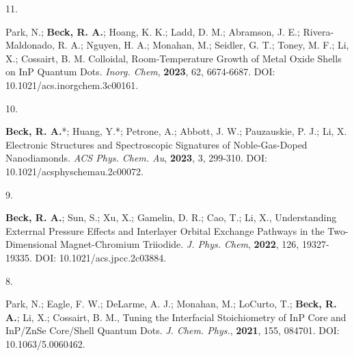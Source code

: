 

\begin{cvpublications}


\cvpublication
{11.}
{\parbox[t]{0.95\textwidth}{\strut Park, N.; \textbf{Beck, R. A.}; Hoang, K. K.; Ladd, D. M.; Abramson, J. E.; Rivera-Maldonado, R. A.; Nguyen, H. A.; Monahan, M.; Seidler, G. T.; Toney, M. F.; Li, X.; Cossairt, B. M.
Colloidal, Room-Temperature Growth of Metal Oxide Shells on InP Quantum Dots.
\textit{Inorg. Chem}, \textbf{2023}, 62, 6674-6687.
DOI: 10.1021/acs.inorgchem.3c00161.}}



\cvpublication
{10.}
{\parbox[t]{0.95\textwidth}{\strut \textbf{Beck, R. A.}*; Huang, Y.*; Petrone, A.; Abbott, J. W.; Pauzauskie, P. J.; Li, X.
Electronic Structures and Spectroscopic Signatures of Noble-Gas-Doped Nanodiamonds.
\textit{ACS Phys. Chem. Au}, \textbf{2023}, 3, 299-310.
DOI: 10.1021/acsphyschemau.2c00072.}}



\cvpublication
{9.}
{\parbox[t]{0.95\textwidth}{\strut \textbf{Beck, R. A.}; Sun, S.; Xu, X.; Gamelin, D. R.; Cao, T.; Li, X.,
Understanding Exterrnal Pressure Effects and Interlayer Orbital Exchange Pathways in the Two-Dimensional Magnet-Chromium Triiodide.
\textit{J. Phys. Chem}, \textbf{2022}, 126, 19327-19335.
DOI: 10.1021/acs.jpcc.2c03884.}}



\cvpublication
{8.}
{\parbox[t]{0.95\textwidth}{\strut Park, N.; Eagle, F. W.; DeLarme, A. J.; Monahan, M.; LoCurto, T.; \textbf{Beck, R. A.}; Li, X.; Cossairt, B. M.,
Tuning the Interfacial Stoichiometry of InP Core and InP/ZnSe Core/Shell Quantum Dots.
\textit{J. Chem. Phys.}, \textbf{2021}, 155, 084701.
DOI: 10.1063/5.0060462.}}


\end{cvpublications}

